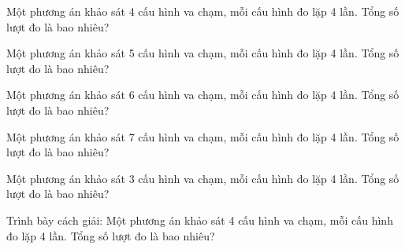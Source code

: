 \begin{ex}
Một phương án khảo sát 4 cấu hình va chạm, mỗi cấu hình đo lặp 4 lần. Tổng số lượt đo là bao nhiêu?
\end{ex}

\begin{ex}
Một phương án khảo sát 5 cấu hình va chạm, mỗi cấu hình đo lặp 4 lần. Tổng số lượt đo là bao nhiêu?
\end{ex}

\begin{ex}
Một phương án khảo sát 6 cấu hình va chạm, mỗi cấu hình đo lặp 4 lần. Tổng số lượt đo là bao nhiêu?
\end{ex}

\begin{ex}
Một phương án khảo sát 7 cấu hình va chạm, mỗi cấu hình đo lặp 4 lần. Tổng số lượt đo là bao nhiêu?
\end{ex}

\begin{ex}
Một phương án khảo sát 3 cấu hình va chạm, mỗi cấu hình đo lặp 4 lần. Tổng số lượt đo là bao nhiêu?
\end{ex}

\begin{bt}
Trình bày cách giải: Một phương án khảo sát 4 cấu hình va chạm, mỗi cấu hình đo lặp 4 lần. Tổng số lượt đo là bao nhiêu?
\end{bt}


